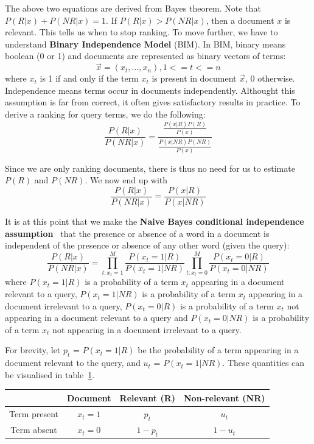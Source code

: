 The above two equations are derived from Bayes theorem.
Note that $P(R|x) + P(NR|x) = 1$. If $P(R|x) > P(NR|x)$, then a document $x$ is relevant. This tells us when to stop ranking. To move further, we have
to understand \textbf{Binary Independence Model} (BIM). In BIM, binary means boolean (0 or 1) and documents are represented as binary vectors of terms:
\[\vec{x} = (x_t,...,x_n), 1 <= t <= n\] where $x_t$ is 1 if and only if the term $x_t$ is present in document $\vec{x}$, 0 otherwise. Independence means terms occur
in documents independently. Althought this assumption is far from correct, it often gives satisfactory results in practice.
To derive a ranking for query terms, we do the following:
\begin{equation}
\frac{P(R|x)}{P(NR|x)} = \frac{\frac{P(x|R)P(R)}{P(x)}}{\frac{P(x|NR)P(NR)}{P(x)}}
\end{equation}

Since we are only ranking documents, there is thus no need for us to estimate $P(R)$ and $P(NR)$. We now end up with 
\begin{equation}
\frac{P(R|x)}{P(NR|x)} = \frac{P(x|R)}{P(x|NR)}
\end{equation}


It is at this point that
we make the \textbf{Naive Bayes conditional independence assumption}~\cite[P. 261]{introToIR} that the presence
or absence of a word in a document is independent of the presence or absence
of any other word (given the query):
\begin{equation} \label{eq:prod}
\frac{P(R|x)}{P(NR|x)} = \prod_{t:x_t=1}^M\frac{P(x_t = 1|R)}{P(x_t = 1|NR)} \prod_{t:x_t=0}^M\frac{P(x_t = 0|R)}{P(x_t = 0|NR)}
\end{equation}
where ${P(x_t = 1|R)}$ is a probability of a term $x_t$ appearing in a document relevant to a query, ${P(x_t = 1|NR)}$ is a probability of a term $x_t$ appearing in a document irrelevant
to a query, $P(x_t = 0|R)$ is a probability of a term $x_t$ not appearing in a document relevant to a query and 
$P(x_t = 0|NR)$ is a probability of a term $x_t$ not appearing in a document irrelevant to a query. 


For brevity, let $p_t$ = ${P(x_t = 1|R)}$ be the probability of a term appearing in a document relevant to the query, and $u_t$ = $P(x_t = 1|NR)$.
These quantities can be visualised in table~\ref{table:bim}.

\begin{table}
 \centering
\begin{tabular}{|c|c|c|c|}
\hline  & \textbf{Document} & \textbf{Relevant (R)} & \textbf{Non-relevant (NR)} \\
\hline Term present & $x_t = 1$ & $p_t$ & $u_t$\\
\hline Term absent & $x_t = 0$ & $1 - p_t$ & $1 - u_t$ \\ 
\hline
\end{tabular}
\label{table:bim}
\end{table}

